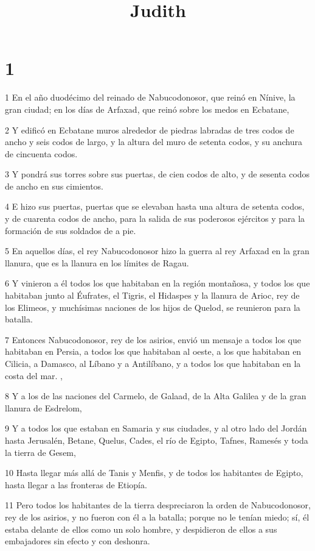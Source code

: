 

\title{Judith}


\chapter{1}

\par 1 En el año duodécimo del reinado de Nabucodonosor, que reinó en Nínive, la gran ciudad; en los días de Arfaxad, que reinó sobre los medos en Ecbatane,
\par 2 Y edificó en Ecbatane muros alrededor de piedras labradas de tres codos de ancho y seis codos de largo, y la altura del muro de setenta codos, y su anchura de cincuenta codos.
\par 3 Y pondrá sus torres sobre sus puertas, de cien codos de alto, y de sesenta codos de ancho en sus cimientos.
\par 4 E hizo sus puertas, puertas que se elevaban hasta una altura de setenta codos, y de cuarenta codos de ancho, para la salida de sus poderosos ejércitos y para la formación de sus soldados de a pie.
\par 5 En aquellos días, el rey Nabucodonosor hizo la guerra al rey Arfaxad en la gran llanura, que es la llanura en los límites de Ragau.
\par 6 Y vinieron a él todos los que habitaban en la región montañosa, y todos los que habitaban junto al Éufrates, el Tigris, el Hidaspes y la llanura de Arioc, rey de los Elimeos, y muchísimas naciones de los hijos de Quelod, se reunieron para la batalla.
\par 7 Entonces Nabucodonosor, rey de los asirios, envió un mensaje a todos los que habitaban en Persia, a todos los que habitaban al oeste, a los que habitaban en Cilicia, a Damasco, al Líbano y a Antilíbano, y a todos los que habitaban en la costa del mar. ,
\par 8 Y a los de las naciones del Carmelo, de Galaad, de la Alta Galilea y de la gran llanura de Esdrelom,
\par 9 Y a todos los que estaban en Samaria y sus ciudades, y al otro lado del Jordán hasta Jerusalén, Betane, Quelus, Cades, el río de Egipto, Tafnes, Ramesés y toda la tierra de Gesem,
\par 10 Hasta llegar más allá de Tanis y Menfis, y de todos los habitantes de Egipto, hasta llegar a las fronteras de Etiopía.
\par 11 Pero todos los habitantes de la tierra despreciaron la orden de Nabucodonosor, rey de los asirios, y no fueron con él a la batalla; porque no le tenían miedo; sí, él estaba delante de ellos como un solo hombre, y despidieron de ellos a sus embajadores sin efecto y con deshonra.
